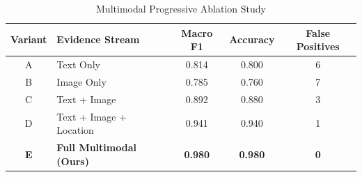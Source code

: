 \begin{table}[htbp]
\caption{Multimodal Progressive Ablation Study}
\label{tab:ablation_study}
\centering
\begin{tabular}{|c|l|c|c|c|}
\hline
\textbf{Variant} & \textbf{Evidence Stream} & \textbf{Macro F1} & \textbf{Accuracy} & \textbf{False Positives} \\
\hline
A & Text Only & 0.814 & 0.800 & 6 \\
B & Image Only & 0.785 & 0.760 & 7 \\
C & Text + Image & 0.892 & 0.880 & 3 \\
D & Text + Image + Location & 0.941 & 0.940 & 1 \\
\textbf{E} & \textbf{Full Multimodal (Ours)} & \textbf{0.980} & \textbf{0.980} & \textbf{0} \\
\hline
\end{tabular}
\end{table}

